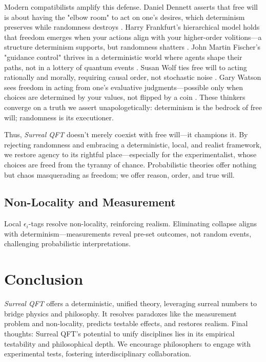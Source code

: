 \documentclass{article}
\begin{document}
Modern compatibilists amplify this defense. Daniel Dennett asserts that free will is about having the "elbow room" to act on one's desires, which determinism preserves while randomness destroys \cite{Dennett1984}. Harry Frankfurt's hierarchical model holds that freedom emerges when your actions align with your higher-order volitions---a structure determinism supports, but randomness shatters \cite{Frankfurt1971}. John Martin Fischer's "guidance control" thrives in a deterministic world where agents shape their paths, not in a lottery of quantum events \cite{Fischer1994}. Susan Wolf ties free will to acting rationally and morally, requiring causal order, not stochastic noise \cite{Wolf1990}. Gary Watson sees freedom in acting from one's evaluative judgments---possible only when choices are determined by your values, not flipped by a coin \cite{Watson1975}. These thinkers converge on a truth we assert unapologetically: determinism is the bedrock of free will; randomness is its executioner.

Thus, \textit{Surreal QFT} doesn't merely coexist with free will---it champions it. By rejecting randomness and embracing a deterministic, local, and realist framework, we restore agency to its rightful place---especially for the experimentalist, whose choices are freed from the tyranny of chance. Probabilistic theories offer nothing but chaos masquerading as freedom; we offer reason, order, and true will.

\subsection{Non-Locality and Measurement}
Local \(\epsilon_i\)-tags resolve non-locality, reinforcing realism. Eliminating collapse aligns with determinism---measurements reveal pre-set outcomes, not random events, challenging probabilistic interpretations.

\section{Conclusion}
\textit{Surreal QFT} offers a deterministic, unified theory, leveraging surreal numbers to bridge physics and philosophy. It resolves paradoxes like the measurement problem and non-locality, predicts testable effects, and restores realism. Final thoughts: Surreal QFT's potential to unify disciplines lies in its empirical testability and philosophical depth. We encourage philosophers to engage with experimental tests, fostering interdisciplinary collaboration.
\end{document}
